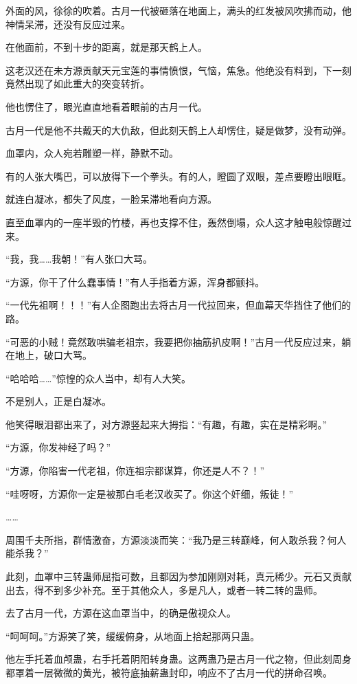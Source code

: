 \begin{this_body}
外面的风，徐徐的吹着。古月一代被砸落在地面上，满头的红发被风吹拂而动，他神情呆滞，还没有反应过来。

在他面前，不到十步的距离，就是那天鹤上人。

这老汉还在未方源贡献天元宝莲的事情愤恨，气恼，焦急。他绝没有料到，下一刻竟然出现了如此重大的突变转折。

他也愣住了，眼光直直地看着眼前的古月一代。

古月一代是他不共戴天的大仇敌，但此刻天鹤上人却愣住，疑是做梦，没有动弹。

血罩内，众人宛若雕塑一样，静默不动。

有的人张大嘴巴，可以放得下一个拳头。有的人，瞪圆了双眼，差点要瞪出眼眶。

就连白凝冰，都失了风度，一脸呆滞地看向方源。

直至血罩内的一座半毁的竹楼，再也支撑不住，轰然倒塌，众人这才触电般惊醒过来。

“我，我……我朝！”有人张口大骂。

“方源，你干了什么蠢事情！”有人手指着方源，浑身都颤抖。

“一代先祖啊！！！”有人企图跑出去将古月一代拉回来，但血幕天华挡住了他们的路。

“可恶的小贼！竟然敢哄骗老祖宗，我要把你抽筋扒皮啊！”古月一代反应过来，躺在地上，破口大骂。

“哈哈哈……”惊惶的众人当中，却有人大笑。

不是别人，正是白凝冰。

他笑得眼泪都出来了，对方源竖起来大拇指：“有趣，有趣，实在是精彩啊。”

“方源，你发神经了吗？”

“方源，你陷害一代老祖，你连祖宗都谋算，你还是人不？！”

“哇呀呀，方源你一定是被那白毛老汉收买了。你这个奸细，叛徒！”

……

周围千夫所指，群情激奋，方源淡淡而笑：“我乃是三转巅峰，何人敢杀我？何人能杀我？”

此刻，血罩中三转蛊师屈指可数，且都因为参加刚刚对耗，真元稀少。元石又贡献出去，得不到多少补充。至于其他众人，多是凡人，或者一转二转的蛊师。

去了古月一代，方源在这血罩当中，的确是傲视众人。

“呵呵呵。”方源笑了笑，缓缓俯身，从地面上拾起那两只蛊。

他左手托着血颅蛊，右手托着阴阳转身蛊。这两蛊乃是古月一代之物，但此刻周身都罩着一层微微的黄光，被符底抽薪蛊封印，响应不了古月一代的拼命召唤。


\end{this_body}
